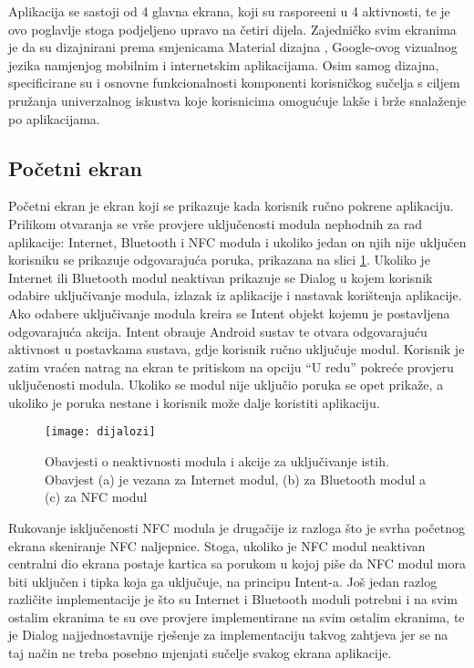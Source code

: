 Aplikacija se sastoji od 4 glavna ekrana, koji su raspore\dj eni u 4 aktivnosti, te je ovo poglavlje stoga podjeljeno upravo na \v{c}etiri dijela. Zajedni\v{c}ko svim ekranima je da su dizajnirani prema smjenicama Material dizajna \cite{materialDesign}, Google-ovog vizualnog jezika namjenjog mobilnim i internetskim aplikacijama. Osim samog dizajna, specificirane su i osnovne funkcionalnosti komponenti korisni\v{c}kog su\v{c}elja s ciljem pru\v{z}anja univerzalnog iskustva koje korisnicima omogu\'{c}uje lak\v{s}e i br\v{z}e snala\v{z}enje po aplikacijama.

\subsection{Po\v{c}etni ekran}

Po\v{c}etni ekran je ekran koji se prikazuje kada korisnik ru\v{c}no pokrene aplikaciju. Prilikom otvaranja se vr\v{s}e provjere uklju\v{c}enosti modula nephodnih za rad aplikacije: Internet, Bluetooth i NFC modula i ukoliko jedan on njih nije uklju\v{c}en korisniku se prikazuje odgovaraju\'{c}a poruka, prikazana na slici \ref{fig:dijalozi}.
Ukoliko je Internet ili Bluetooth modul neaktivan prikazuje se Dialog \cite{androidDialog} u kojem korisnik odabire uklju\v{c}ivanje modula, izlazak iz aplikacije i nastavak kori\v{s}tenja aplikacije. Ako odabere uklju\v{c}ivanje modula kreira se Intent objekt kojemu je postavljena odgovaraju\'{c}a akcija. Intent obra\dj uje Android sustav te otvara odgovaraju\'{c}u aktivnost u postavkama sustava, gdje korisnik ru\v{c}no uklju\v{c}uje modul. Korisnik je zatim vra\'{c}en natrag na ekran te pritiskom na opciju ``U redu'' pokre\'{c}e provjeru uklju\v{c}enosti modula. Ukoliko se modul nije uklju\v{c}io poruka se opet prika\v{z}e, a ukoliko je poruka nestane i korisnik mo\v{z}e dalje koristiti aplikaciju.


\begin{figure}[!htbp]
	\begin{center}
 \texttt{[image: dijalozi]}
 \caption{Obavjesti o neaktivnosti modula i akcije za uklju\v{c}ivanje istih. Obavjest (a) je vezana za Internet modul, (b) za Bluetooth modul a (c) za NFC modul}
 \label{fig:dijalozi}
	\end{center}
\end{figure}



Rukovanje isklju\v{c}enosti NFC modula je druga\v{c}ije iz razloga \v{s}to je svrha po\v{c}etnog ekrana skeniranje NFC naljepnice. Stoga, ukoliko je NFC modul neaktivan centralni dio ekrana postaje kartica sa porukom u kojoj pi\v{s}e da NFC modul mora biti uklju\v{c}en i tipka koja ga uklju\v{c}uje, na principu Intent-a. Jo\v{s} jedan razlog razli\v{c}ite implementacije je \v{s}to su Internet i Bluetooth moduli potrebni i na svim ostalim ekranima te su ove provjere implementirane na svim ostalim ekranima, te je Dialog najjednostavnije rje\v{s}enje za implementaciju takvog zahtjeva jer se na taj na\v{c}in ne treba posebno mjenjati su\v{c}elje svakog ekrana aplikacije.

